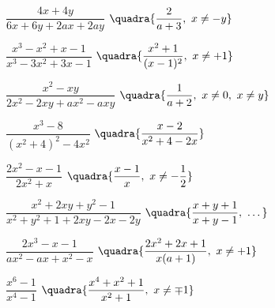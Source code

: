 \begin{esercizio}[\Ast]
\begin{multicols}{2}
\begin{enumeratea}
 \item \(\dfrac{4x+4y}{6x+6y+2ax+2ay}\)
  \hfill {\footnotesize \(\quadra{\dfrac{2}{a+3},~ x \neq -y}\)}
 \item \(\dfrac{x^{3}-x^{2}+x-1}{x^{3}-3x^{2}+3x-1}\)
  \hfill {\footnotesize \(\quadra{\dfrac{x^{2}+1}{(x-1)^2},~ x \neq +1}\)}
 \item \(\dfrac{x^{2}-xy}{2x^{2}-2xy+ax^{2}-axy}\)
  \hfill {\footnotesize \(\quadra{\dfrac{1}{a+2},~ x \neq 0,~ x \neq y}\)}
 \item \(\dfrac{x^{3}-8}{\left(x^{2}+4\right)^{2}-4x^{2}}\)
  \hfill {\footnotesize \(\quadra{\dfrac{x-2}{x^2+4-2x}}\)}
 \item \(\dfrac{2x^{2}-x-1}{2x^{2}+x}\)
  \hfill {\footnotesize \(\quadra{\dfrac{x-1}{x},~ x \neq -\dfrac{1}{2}}\)}
 \item \(\dfrac{x^{2}+2xy+y^{2}-1}{x^{2}+y^{2}+1+2xy-2x-2y}\)
  \hfill {\footnotesize \(\quadra{\dfrac{x+y+1}{x+y-1},~\dots}\)}
 \item \(\dfrac{2x^{3}-x-1}{ax^{2}-ax+x^{2}-x}\)
  \hfill {\footnotesize \(\quadra{\dfrac{2x^2+2x+1}{x(a+1)},~ x \neq +1}\)}
 \item \(\dfrac{x^{6}-1}{x^{4}-1}\)
  \hfill {\footnotesize \(\quadra{\dfrac{x^{4}+x^{2}+1}{x^2+1},~x \neq \mp 1}\)}
\end{enumeratea}
\end{multicols}
\end{esercizio}

\subsubsection*{}

